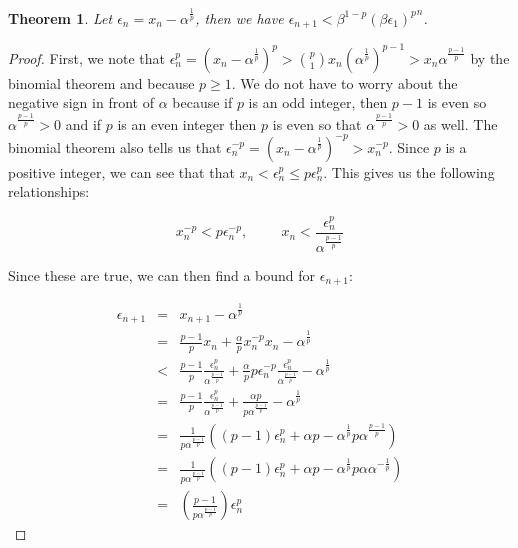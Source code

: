 \documentclass[psamsfonts]{amsart}
\newtheorem{thm}{Theorem}[section]
\theoremstyle{definition}
\theoremstyle{remark}
\numberwithin{equation}{section}
\begin{document}
\begin{thm}
Let $\epsilon_n = x_n - \alpha^{\frac{1}{p}}$, then we have $\epsilon_{n+1} < \beta^{1-p} {(\beta \epsilon_1)^p}^n$.
\end{thm}

\begin{proof}
First, we note that $\epsilon_n^p = (x_n - \alpha^{\frac{1}{p}})^p > {p \choose 1} x_n (\alpha^{\frac{1}{p}})^{p-1} > x_n \alpha^{\frac{p-1}{p}}$ by the binomial theorem and because $p \geq 1$. We do not have to worry about the negative sign in front of $\alpha$ because if $p$ is an odd integer, then $p-1$ is even so $\alpha^{\frac{p-1}{p}} > 0$ and if $p$ is an even integer then $p$ is even so that $\alpha^{\frac{p-1}{p}} > 0$ as well.  The binomial theorem also tells us that $\epsilon_n^{-p} = (x_n - \alpha^{\frac{1}{p}})^{-p} > x_n^{-p}$. Since $p$ is a positive integer, we can see that that $x_n < \epsilon_n^p \leq p \epsilon_n^p$. This gives us the following relationships:

\begin{equation}
x_n^{-p} < p \epsilon_n^{-p}, \hspace{1cm} x_n < \frac{\epsilon_n^{p}}{\alpha^{\frac{p-1}{p}}}
\end{equation}

Since these are true, we can then find a bound for $\epsilon_{n+1}$:

\begin{eqnarray}
\epsilon_{n+1} &=& x_{n+1} - \alpha^{\frac{1}{p}} \\
&=& \frac{p-1}{p} x_n + \frac{\alpha}{p}x_n^{-p} x_n - \alpha^{\frac{1}{p}} \\
&<& \frac{p-1}{p} \frac{\epsilon_n^p}{\alpha^{\frac{p-1}{p}}} + \frac{\alpha}{p} p \epsilon_n^{-p}\frac{\epsilon_n^p}{\alpha^{\frac{p-1}{p}}} - \alpha^{\frac{1}{p}} \\
&=& \frac{p-1}{p} \frac{\epsilon_n^p}{\alpha^{\frac{p-1}{p}}} + \frac{\alpha p}{p \alpha^{\frac{p-1}{p}}} - \alpha^{\frac{1}{p}} \\
&=& \frac{1}{p \alpha^{\frac{p-1}{p}}} \left( (p-1) \epsilon_n^p + \alpha p - \alpha^{\frac{1}{p}} p \alpha^{\frac{p-1}{p}} \right) \\
&=& \frac{1}{p \alpha^{\frac{p-1}{p}}} \left( (p-1) \epsilon_n^p + \alpha p - \alpha^{\frac{1}{p}} p \alpha \alpha^{-\frac{1}{p}} \right) \\
&=& \left( \frac{p-1}{p \alpha^{\frac{p-1}{p}}} \right) \epsilon_n^p
\end{eqnarray}  


\end{proof}
\end{document}
